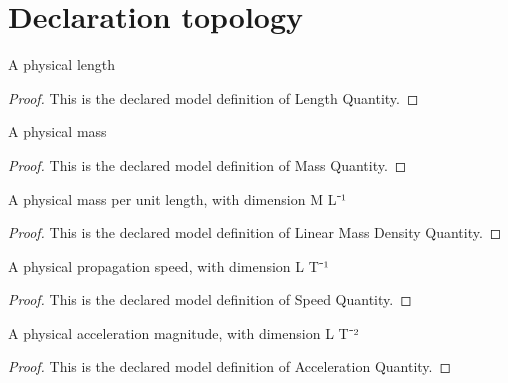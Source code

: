 \section{Declaration topology}
\begin{definition}
  \label{def:physics:phyx-mini-0242:phyxminiproblems-problemphyxmini0242-lengthquantity}
  A physical length
\end{definition}
\begin{proof}
  This is the declared model definition of Length Quantity.
\end{proof}
\begin{definition}
  \label{def:physics:phyx-mini-0242:phyxminiproblems-problemphyxmini0242-massquantity}
  A physical mass
\end{definition}
\begin{proof}
  This is the declared model definition of Mass Quantity.
\end{proof}
\begin{definition}
  \label{def:physics:phyx-mini-0242:phyxminiproblems-problemphyxmini0242-linearmassdensityquantity}
  A physical mass per unit length, with dimension M L⁻¹
\end{definition}
\begin{proof}
  This is the declared model definition of Linear Mass Density Quantity.
\end{proof}
\begin{definition}
  \label{def:physics:phyx-mini-0242:phyxminiproblems-problemphyxmini0242-speedquantity}
  A physical propagation speed, with dimension L T⁻¹
\end{definition}
\begin{proof}
  This is the declared model definition of Speed Quantity.
\end{proof}
\begin{definition}
  \label{def:physics:phyx-mini-0242:phyxminiproblems-problemphyxmini0242-accelerationquantity}
  A physical acceleration magnitude, with dimension L T⁻²
\end{definition}
\begin{proof}
  This is the declared model definition of Acceleration Quantity.
\end{proof}
